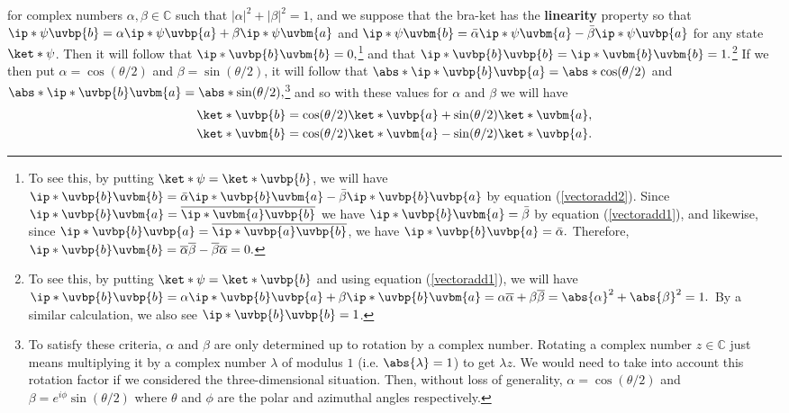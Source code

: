\documentclass[12pt]{report}
\begin{document}
for complex numbers $\alpha, \beta \in \mathbb{C}$ such that $|\alpha|^2+|\beta|^2=1$, and we suppose that the bra-ket has the \textbf{linearity}\label{linearity} property so that  $\ip*{\psi}{\uvbp{b}}=\alpha\ip*{\psi}{\uvbp{a}}+\beta\ip*{\psi}{\uvbm{a}}$ and $\ip*{\psi}{\uvbm{b}}=\bar{\alpha}\ip*{\psi}{\uvbm{a}}-\bar{\beta}\ip*{\psi}{\uvbp{a}}$ for any state $\ket*{\psi}$. Then  it will follow that  $\ip*{\uvbp{b}}{\uvbm{b}}=0,$\footnote{To see this, by putting $\ket*{\psi}=\ket*{\uvbp{b}}$, we will have $\ip*{\uvbp{b}}{\uvbm{b}}=\bar{\alpha}\ip*{\uvbp{b}}{\uvbm{a}}-\bar{\beta}\ip*{\uvbp{b}}{\uvbp{a}}$ by equation (\ref{vectoradd2}). Since  $\ip*{\uvbp{b}}{\uvbm{a}}=\overline{\ip*{\uvbm{a}}{\uvbp{b}}}$ we have $\ip*{\uvbp{b}}{\uvbm{a}}=\bar{\beta}$ by equation (\ref{vectoradd1}), and likewise, since $\ip*{\uvbp{b}}{\uvbp{a}}=\overline{\ip*{\uvbp{a}}{\uvbp{b}}}$, we have $\ip*{\uvbp{b}}{\uvbp{a}}=\bar{\alpha}.$  Therefore,  $\ip*{\uvbp{b}}{\uvbm{b}}=\overline{\alpha}\overline{\beta}-\overline{\beta}{\overline{\alpha}}=0.$}  and that $\ip*{\uvbp{b}}{\uvbp{b}}=\ip*{\uvbm{b}}{\uvbm{b}} = 1.$\footnote{To see this, by putting $\ket*{\psi}=\ket*{\uvbp{b}}$ and using equation (\ref{vectoradd1}), we will have $\ip*{\uvbp{b}}{\uvbp{b}}=\alpha\ip*{\uvbp{b}}{\uvbp{a}}+\beta\ip*{\uvbp{b}}{\uvbm{a}}=\alpha\overline{\alpha}+\beta\overline{\beta}=\abs{\alpha}^2+\abs{\beta}^2=1.$ By a similar calculation, we also see $\ip*{\uvbp{b}}{\uvbp{b}}=1$.}  
If we then put  $\alpha=\cos(\theta/2)$ and $\beta=\sin(\theta/2)$, it will follow that $\abs*{\ip*{\uvbp{b}}{\uvbp{a}}}=\abs*{\cos(\theta/2)}$ and  $\abs*{\ip*{\uvbp{b}}{\uvbm{a}}}=\abs*{\sin(\theta/2)},$\footnote{To satisfy these criteria, $\alpha$ and $\beta$ are only determined up to rotation by a complex number. Rotating a complex number $z\in\mathbb{C}$ just means multiplying it by a complex number $\lambda$ of modulus $1$ (i.e. $\abs{\lambda}=1$) to get $\lambda z$. We would need to take into account this rotation factor if we considered the three-dimensional situation. Then, without loss of generality, $\alpha=\cos(\theta/2)$ and $\beta=e^{i\phi}\sin(\theta/2)$ where $\theta$ and $\phi$ are the polar and azimuthal angles respectively.} and so with these values for $\alpha$ and $\beta$ we will have
\begin{subequations}\label{spintrans}
\begin{align}
\ket*{\uvbp{b}}&= \cos(\theta/2)\ket*{\uvbp{a}}+\sin(\theta/2) \ket*{\uvbm{a}},\label{spintrans1}\\
\ket*{\uvbm{b}}&= \cos(\theta/2)\ket*{\uvbm{a}}-\sin(\theta/2) \ket*{\uvbp{a}}.\label{spintrans2}
\end{align}
\end{subequations} 
\end{document}
